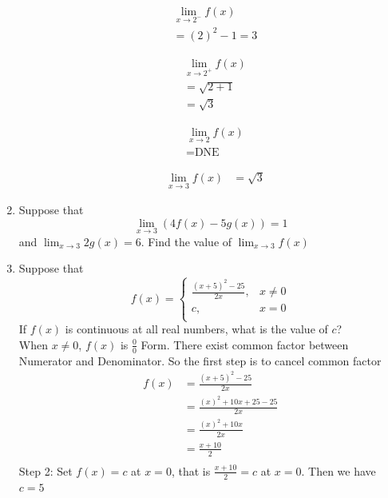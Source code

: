 \documentclass{exam}
\begin{document}
\begin{enumerate}
\vfill


\begin{minipage}{.3\linewidth}
\begin{align*}
 &\lim_{x\to 2^{-}}f(x)\\
 &=(2)^{2}-1=3
\end{align*}
\end{minipage}%
\begin{minipage}{.2\linewidth}
\begin{align*}
 &\lim_{x\to 2^{+}}f(x)\\
 &=\sqrt{2+1}\\
 &=\sqrt{3}
\end{align*}
\end{minipage}%
\begin{minipage}{.2\linewidth}
\begin{align*}
 &\lim_{x\to 2}f(x)\\
 &=\text{DNE}
\end{align*}
\end{minipage}
\begin{minipage}{.2\linewidth}
\begin{align*}
 &\lim_{x\to 3}f(x)
 &=\sqrt{3}
\end{align*}
\end{minipage}
\vfill

\item Suppose that $$\lim_{x\to 3}(4f(x)-5g(x))=1$$ and $\lim_{x\to 3}2g(x)=6$. Find the value of $\lim_{x\to 3}f(x)$
\vfill\vfill


\item Suppose that 
\[   f(x)=\left\{
\begin{array}{ll}
     \frac{(x+5)^{2}-25}{2x}, & x \neq 0 \\
      c,   & x=0 \\
\end{array} 
\right. \]
If $f(x)$ is continuous at all real numbers, what is the value of $c$? \\
When $x \neq 0$, $f(x)$ is $\frac{0}{0}$ Form. There exist common factor between Numerator and Denominator. So the first step is to cancel common factor
\begin{align*}
 f(x)  & = \frac{(x+5)^{2}-25}{2x}\\
       & = \frac{(x)^{2}+10x+25-25}{2x} \\   
       & = \frac{(x)^{2}+10x}{2x} \\
       & = \frac{x+10}{2} \\
\end{align*}
Step 2: Set $f(x)=c$ at $x=0$, that is $\frac{x+10}{2}=c$ at $x=0$. Then we have $c=5$


\end{enumerate}
\end{document}
